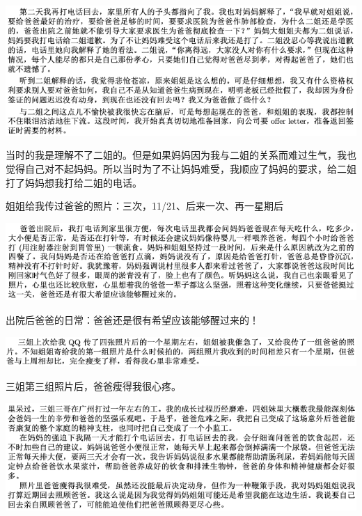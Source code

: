 \documentclass[9pt, b5paper]{article}
\begin{document}
\begin{center}
\includegraphics[width=.9\linewidth]{./pic/backups_plans_20210416_162408.png}
\end{center}

当时的我是理解不了二姐的。但是如果妈妈因为我与二姐的关系而难过生气，我也觉得自己对不起妈妈。所以当时为了不让妈妈难受，我顺应了妈妈的要求，给二姐打了妈妈想我打给二姐的电话。

姐姐给我传过爸爸的照片：三次，11/21、后来一次、再一星期后

\begin{center}
\includegraphics[width=.9\linewidth]{./pic/backups_plans_20210416_162738.png}
\end{center}

出院后爸爸的日常：爸爸还是很有希望应该能够醒过来的！

\begin{center}
\includegraphics[width=.9\linewidth]{./pic/backups_plans_20210416_163119.png}
\end{center}

三姐第三组照片后，爸爸瘦得我很心疼。

\begin{center}
\includegraphics[width=.9\linewidth]{./pic/backups_plans_20210416_163250.png}
\end{center}
\end{document}
